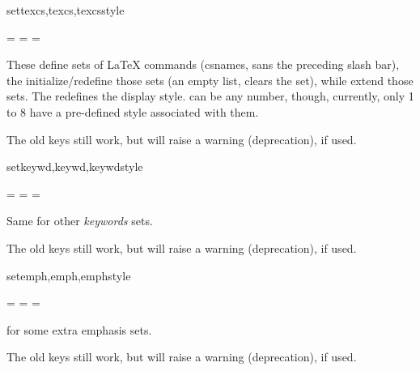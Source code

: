 \documentclass{article}
\begin{document}
\begin{codedescribe}[key,update=2025/05/01,update=2025/12/29]{settexcs,texcs,texcsstyle}
\begin{codesyntax}%
   = 
   = 
   = 
\end{codesyntax}
These define sets of \LaTeX{} commands (csnames, sans the preceding slash bar), the  initialize/redefine those sets (an empty list, clears the set), while   extend those sets. The  redefines the display style.  can be any number, though, currently, only 1 to 8 have a pre-defined style associated with them.
\end{codedescribe}
\begin{tsremark}
  The old keys 	 still work, but will raise a warning (deprecation), if used.
\end{tsremark}


\begin{codedescribe}[key,update=2025/05/01,update=2025/12/29]{setkeywd,keywd,keywdstyle}
\begin{codesyntax}	%
   = 
   = 
   = 
\end{codesyntax}
Same for other \emph{keywords} sets.
\end{codedescribe}
\begin{tsremark}
  The old keys 	 still work, but will raise a warning (deprecation), if used.
\end{tsremark}
	

\begin{codedescribe}[key,update=2025/05/01,update=2025/12/29]{setemph,emph,emphstyle}
\begin{codesyntax}	%
   = 
   = 
   = 
\end{codesyntax}
for some extra emphasis sets.
\end{codedescribe}
\begin{tsremark}
  The old keys 		 still work, but will raise a warning (deprecation), if used.
\end{tsremark}
\end{document}
